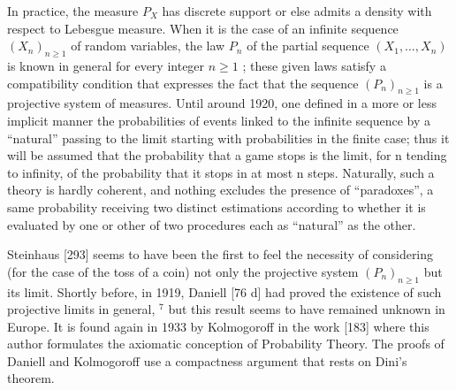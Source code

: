 In practice, the measure \(P_{X}\) has discrete support or else admits a density with respect to Lebesgue measure. When it is the case of an infinite sequence \((X_{n})_{n\geq1}\) of random variables, the law \(P_{n}\) of the partial sequence \((X_{1},\ldots,X_{n})\) is known in general for every integer \(n\geq1\) ; these given laws satisfy a compatibility condition that expresses the fact that the sequence \((P_{n})_{n\geq1}\) is a projective system of measures. Until around 1920, one defined in a more or less implicit manner the probabilities of events linked to the infinite sequence by a ``natural'' passing to the limit starting with probabilities in the finite case; thus it will be assumed that the probability that a game stops is the limit, for n tending to infinity, of the probability that it stops in at most n steps. Naturally, such a theory is hardly coherent, and nothing excludes the presence of ``paradoxes'', a same probability receiving two distinct estimations according to whether it is evaluated by one or other of two procedures each as ``natural'' as the other.

Steinhaus {[}293{]} seems to have been the first to feel the necessity of considering (for the case of the toss of a coin) not only the projective system \((P_{n})_{n\geq1}\) but its limit. Shortly before, in 1919, Daniell {[}76 d{]} had proved the existence of such projective limits in general, \(^{7}\) but this result seems to have remained unknown in Europe. It is found again in 1933 by Kolmogoroff in the work {[}183{]} where this author formulates the axiomatic conception of Probability Theory. The proofs of Daniell and Kolmogoroff use a compactness argument that rests on Dini's theorem.

